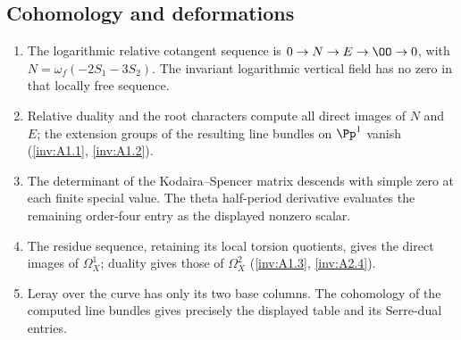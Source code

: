 \subsection{Cohomology and deformations}
\RungOne
\begin{enumerate}[label=\arabic*.]
\item The logarithmic relative cotangent sequence is
$0\to N\to E\to\OO\to0$, with
$N=\omega_f(-2S_1-3S_2)$. The invariant logarithmic vertical
field has no zero in that locally free sequence.
\item Relative duality and the root characters compute all
direct images of $N$ and $E$; the extension groups of the
resulting line bundles on $\Pp^1$ vanish
(\ref{inv:A1.1}, \ref{inv:A1.2}).
\item The determinant of the Kodaira--Spencer matrix descends
with simple zero at each finite special value. The theta
half-period derivative evaluates the remaining order-four
entry as the displayed nonzero scalar.
\item The residue sequence, retaining its local torsion
quotients, gives the direct images of $\Omega_X^1$;
duality gives those of $\Omega_X^2$
(\ref{inv:A1.3}, \ref{inv:A2.4}).
\item Leray over the curve has only its two base columns.
The cohomology of the computed line bundles gives precisely
the displayed table and its Serre-dual entries.
\end{enumerate}

